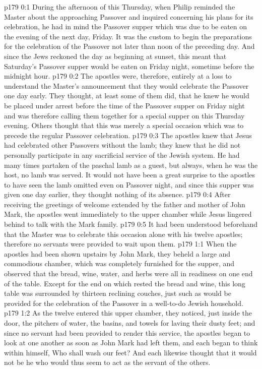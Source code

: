 \author{Midwayer Commission}
\vs p179 0:1 During the afternoon of this Thursday, when Philip reminded the Master about the approaching Passover and inquired concerning his plans for its celebration, he had in mind the Passover supper which was due to be eaten on the evening of the next day, Friday. It was the custom to begin the preparations for the celebration of the Passover not later than noon of the preceding day. And since the Jews reckoned the day as beginning at sunset, this meant that Saturday’s Passover supper would be eaten on Friday night, sometime before the midnight hour.
\vs p179 0:2 The apostles were, therefore, entirely at a loss to understand the Master’s announcement that they would celebrate the Passover one day early. They thought, at least some of them did, that he knew he would be placed under arrest before the time of the Passover supper on Friday night and was therefore calling them together for a special supper on this Thursday evening. Others thought that this was merely a special occasion which was to precede the regular Passover celebration.
\vs p179 0:3 The apostles knew that Jesus had celebrated other Passovers without the lamb; they knew that he did not personally participate in any sacrificial service of the Jewish system. He had many times partaken of the paschal lamb as a guest, but always, when he was the host, no lamb was served. It would not have been a great surprise to the apostles to have seen the lamb omitted even on Passover night, and since this supper was given one day earlier, they thought nothing of its absence.
\vs p179 0:4 After receiving the greetings of welcome extended by the father and mother of John Mark, the apostles went immediately to the upper chamber while Jesus lingered behind to talk with the Mark family.
\vs p179 0:5 It had been understood beforehand that the Master was to celebrate this occasion alone with his twelve apostles; therefore no servants were provided to wait upon them.
\vs p179 1:1 When the apostles had been shown upstairs by John Mark, they beheld a large and commodious chamber, which was completely furnished for the supper, and observed that the bread, wine, water, and herbs were all in readiness on one end of the table. Except for the end on which rested the bread and wine, this long table was surrounded by thirteen reclining couches, just such as would be provided for the celebration of the Passover in a well\hyp{}to\hyp{}do Jewish household.
\vs p179 1:2 As the twelve entered this upper chamber, they noticed, just inside the door, the pitchers of water, the basins, and towels for laving their dusty feet; and since no servant had been provided to render this service, the apostles began to look at one another as soon as John Mark had left them, and each began to think within himself, Who shall wash our feet? And each likewise thought that it would not be he who would thus seem to act as the servant of the others.
